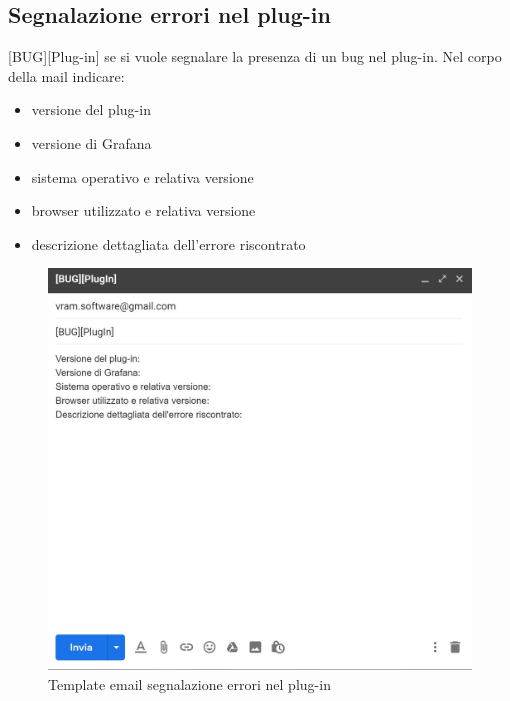 	\subsection{Segnalazione errori nel plug-in}
 	[BUG][Plug-in] se si vuole segnalare la presenza di un bug nel plug-in.
 	Nel corpo della mail indicare:
 	\begin{itemize}
 		\item versione del plug-in
 		\item versione di Grafana
 		\item sistema operativo e relativa versione
 		\item browser utilizzato e relativa versione
 		\item descrizione dettagliata dell'errore riscontrato
 	\end{itemize}
 	\mbox{}
 	\begin{figure} [H]
 		\begin{center}
 			\includegraphics[width=120mm]{./img/erroriPlugIn.jpg}
 		\end{center}
 		\caption{Template email segnalazione errori nel plug-in}
 	\end{figure}
